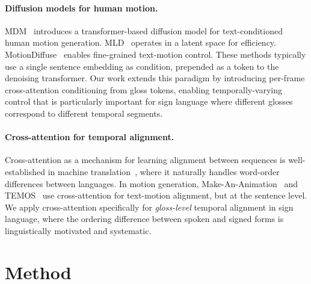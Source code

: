 \documentclass{article}
\begin{document}
\paragraph{Diffusion models for human motion.}
MDM~\citep{tevet2023human} introduces a transformer-based diffusion model for text-conditioned human motion generation.
MLD~\citep{chen2023mld} operates in a latent space for efficiency.
MotionDiffuse~\citep{zhang2022motiondiffuse} enables fine-grained text-motion control.
These methods typically use a single sentence embedding as condition, prepended as a token to the denoising transformer.
Our work extends this paradigm by introducing per-frame cross-attention conditioning from gloss tokens, enabling temporally-varying control that is particularly important for sign language where different glosses correspond to different temporal segments.

\paragraph{Cross-attention for temporal alignment.}
Cross-attention as a mechanism for learning alignment between sequences is well-established in machine translation~\citep{vaswani2017attention,bahdanau2015neural}, where it naturally handles word-order differences between languages.
In motion generation, Make-An-Animation~\citep{azadi2024make} and TEMOS~\citep{petrovich2022temos} use cross-attention for text-motion alignment, but at the sentence level.
We apply cross-attention specifically for \emph{gloss-level} temporal alignment in sign language, where the ordering difference between spoken and signed forms is linguistically motivated and systematic.


\section{Method}
\label{sec:method}
\end{document}

